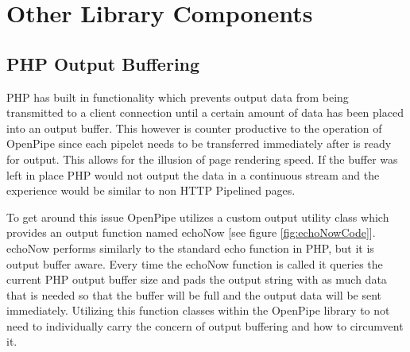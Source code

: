 \documentclass[12pt]{report}
\begin{document}
\chapter{Other Library Components}

\section{PHP Output Buffering}
PHP has built in functionality which prevents output data from being transmitted
to a client connection until a certain amount of data has been placed into an output buffer. This however is counter productive to the operation of OpenPipe since each pipelet needs to be transferred immediately after is ready for output. This allows for the illusion of page rendering speed. If the buffer was left in place PHP would not output the data in a continuous stream and the experience would be similar to non HTTP Pipelined pages. 

To get around this issue OpenPipe utilizes a custom output utility class which provides an output function named echoNow [see figure \ref{fig:echoNowCode}]. echoNow performs similarly to the standard echo function in PHP, but it is output buffer aware. Every time the echoNow function is called it queries the current PHP output buffer size and pads the output string with as much data that is needed so that the buffer will be full and the output data will be sent immediately. Utilizing this function classes within the OpenPipe library to not need to individually carry the concern of output buffering and how to circumvent it.
\end{document}
